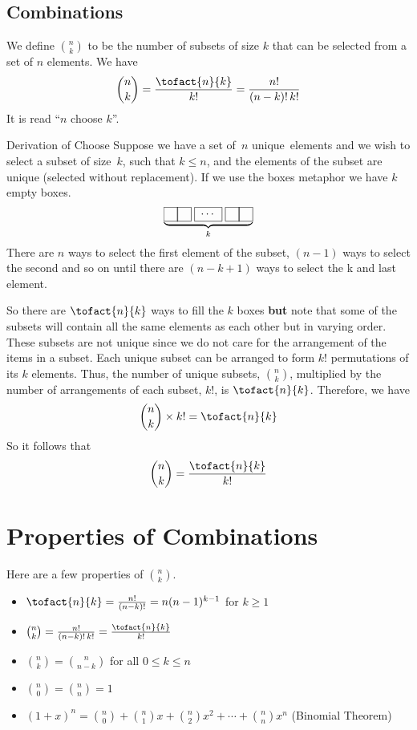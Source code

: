 \subsection*{Combinations}
We define $\binom{n}{k}$ to be the number of subsets of size $k$ that can be selected from a set of $n$ elements. We have
\[
    \binom{n}{k} = \frac{\tofact{n}{k}}{k!} = \frac{n!}{(n-k)!\,k!}
\]
It is read ``$n$ choose $k$''.
\begin{theory}{Derivation of Choose}
Suppose we have a set of~$n$ unique~elements and we wish to select a subset of size~$k$, such that $k \leq n$, and the elements of the subset are unique (selected without replacement). If we use the boxes metaphor we have $k$ empty boxes. 
\[
    \underbrace{\pboxes{0}}_k
\]
There are $n$ ways to select the first element of the subset, $(n-1)$ ways to select the second and so on until there are $(n-k+1)$ ways to select the k and last element.
\par\medskip
So there are $\tofact{n}{k}$ ways to fill the $k$ boxes \textbf{but} note that some of the subsets will contain all the same elements as each other but in varying order. These subsets are not unique since we do not care for the arrangement of the items in a subset. Each unique subset can be arranged to form $k!$ permutations of its $k$ elements. Thus, the number of unique subsets, $\binom{n}{k}$, multiplied by the number of arrangements of each subset, $k!$, is $\tofact{n}{k}$. Therefore, we have
\[
    \binom{n}{k} \times k! = \tofact{n}{k}
\]
So it follows that
\[
    \binom{n}{k} = \frac{\tofact{n}{k}}{k!}
\]
\end{theory}
\section{Properties of Combinations}
Here are a few properties of $\binom{n}{k}$.
\begin{itemize}
    \item $\tofact{n}{k} = \frac{n!}{(n-k)!} = n(n-1)^{k-1}$ for $k \geq 1$
    \item $\binom{n}{k} = \frac{n!}{(n-k)!\,k!} = \frac{\tofact{n}{k}}{k!}$
    \item $\binom{n}{k} = \binom{n}{n-k}$ for all $0 \leq k \leq n$
    \item $\binom{n}{0} = \binom{n}{n} = 1$
    \item $(1 + x)^n = \binom{n}{0} + \binom{n}{1}x + \binom{n}{2}x^2 + \cdots + \binom{n}{n}x^n$ \hfill (Binomial Theorem)
\end{itemize}
